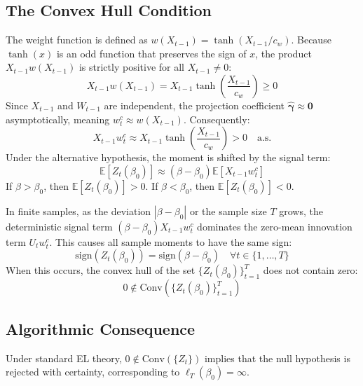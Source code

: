 \documentclass[12pt]{article}
\begin{document}
\subsection{The Convex Hull Condition}
The weight function is defined as $w(X_{t-1}) = \tanh(X_{t-1}/c_w)$. Because $\tanh(x)$ is an odd function that preserves the sign of $x$, the product $X_{t-1} w(X_{t-1})$ is strictly positive for all $X_{t-1} \neq 0$:
\begin{equation}
    X_{t-1} w(X_{t-1}) = X_{t-1} \tanh\left(\frac{X_{t-1}}{c_w}\right) \ge 0
\end{equation}
Since $X_{t-1}$ and $W_{t-1}$ are independent, the projection coefficient $\widehat{\bm{\gamma}} \approx \bm{0}$ asymptotically, meaning $w^c_t \approx w(X_{t-1})$. Consequently:
\begin{equation}
    X_{t-1} w^c_t \approx X_{t-1} \tanh\left(\frac{X_{t-1}}{c_w}\right) > 0 \quad \text{a.s.}
\end{equation}
Under the alternative hypothesis, the moment is shifted by the signal term:
\begin{equation}
    \mathbb{E}[Z_t(\beta_0)] \approx (\beta - \beta_0) \mathbb{E}\left[ X_{t-1} w^c_t \right]
\end{equation}
If $\beta > \beta_0$, then $\mathbb{E}[Z_t(\beta_0)] > 0$. If $\beta < \beta_0$, then $\mathbb{E}[Z_t(\beta_0)] < 0$.

In finite samples, as the deviation $|\beta - \beta_0|$ or the sample size $T$ grows, the deterministic signal term $(\beta - \beta_0) X_{t-1} w^c_t$ dominates the zero-mean innovation term $U_t w^c_t$. This causes all sample moments to have the same sign:
\begin{equation}
    \text{sign}\left( Z_t(\beta_0) \right) = \text{sign}(\beta - \beta_0) \quad \forall t \in \{1, \dots, T\}
\end{equation}
When this occurs, the convex hull of the set $\{Z_t(\beta_0)\}_{t=1}^T$ does not contain zero:
\begin{equation}
    0 \notin \text{Conv}\left( \{Z_t(\beta_0)\}_{t=1}^T \right)
\end{equation}

\subsection{Algorithmic Consequence}
Under standard EL theory, $0 \notin \text{Conv}(\{Z_t\})$ implies that the null hypothesis is rejected with certainty, corresponding to $\ell_T(\beta_0) = \infty$. 
\end{document}
